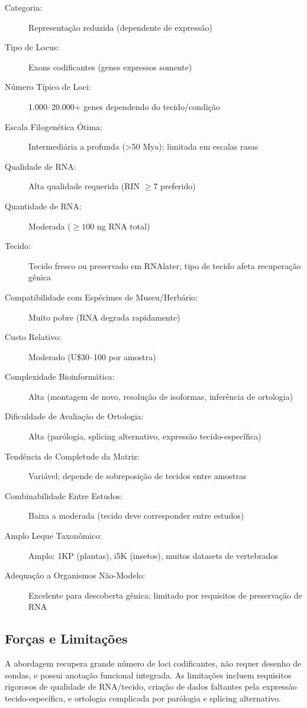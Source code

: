\begin{description}
\item[Categoria:] Representação reduzida (dependente de expressão)
\item[Tipo de Locus:] Exons codificantes (genes expressos somente)
\item[Número Típico de Loci:] 1.000--20.000+ genes dependendo do tecido/condição
\item[Escala Filogenética Ótima:] Intermediária a profunda (>50 Mya); limitada em escalas rasas
\item[Qualidade de RNA:] Alta qualidade requerida (RIN $\geq$7 preferido)
\item[Quantidade de RNA:] Moderada (\(\geq 100\) ng RNA total)
\item[Tecido:] Tecido fresco ou preservado em RNAlater; tipo de tecido afeta recuperação gênica
\item[Compatibilidade com Espécimes de Museu/Herbário:] Muito pobre (RNA degrada rapidamente)
\item[Custo Relativo:] Moderado (U\$30--100 por amostra)
\item[Complexidade Bioinformática:] Alta (montagem de novo, resolução de isoformas, inferência de ortologia)
\item[Dificuldade de Avaliação de Ortologia:] Alta (parólogia, splicing alternativo, expressão tecido-específica)
\item[Tendência de Completude da Matriz:] Variável; depende de sobreposição de tecidos entre amostras
\item[Combinabilidade Entre Estudos:] Baixa a moderada (tecido deve corresponder entre estudos)
\item[Amplo Leque Taxonômico:] Amplo: 1KP (plantas), i5K (insetos), muitos datasets de vertebrados
\item[Adequação a Organismos Não-Modelo:] Excelente para descoberta gênica; limitado por requisitos de preservação de RNA
\end{description}

\subsection{Forças e Limitações}

A abordagem recupera grande número de loci codificantes, não requer desenho de sondas, e possui anotação funcional integrada. As limitações incluem requisitos rigorosos de qualidade de RNA/tecido, criação de dados faltantes pela expressão tecido-específica, e ortologia complicada por parólogia e splicing alternativo.

